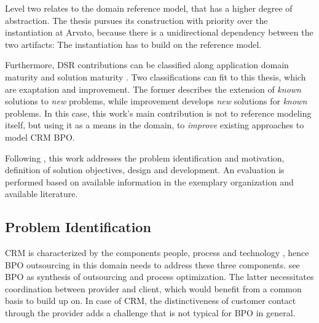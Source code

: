 Level two relates to the domain reference model, that has a higher degree of abstraction. The thesis pursues its construction with priority over the instantiation at Arvato, because there is a unidirectional dependency between the two artifacts: The instantiation has to build on the reference model. 

Furthermore, \acrshort{DSR} contributions can be classified along application domain maturity and solution maturity \citep{gregor2013positioning}. Two classifications can fit to this thesis, which are exaptation and improvement. The former describes the extension of \textit{known} solutions to \textit{new} problems, while improvement develops \textit{new} solutions for \textit{known} problems. In this case, this work's main contribution is not to reference modeling itself, but using it as a means in the domain, to \textit{improve} existing approaches to model CRM BPO. 

Following \citeauthor{Hevner2004,Peffers2007}, this work addresses the problem identification and motivation, definition of solution objectives,  design and development. An evaluation is performed based on available information in the exemplary organization and available literature. 



\subsection{Problem Identification}
\label{sec:proide}
CRM is characterized by the components people, process and technology \citep{Chen_2003}, hence BPO outsourcing in this domain needs to address these three components. \cite{schewe2007} see BPO as synthesis of outsourcing and process optimization. The latter necessitates coordination between provider and client, which would benefit from a common basis to build up on. In case of CRM, the distinctiveness of customer contact through the provider adds a challenge that is not typical for BPO in general. 

